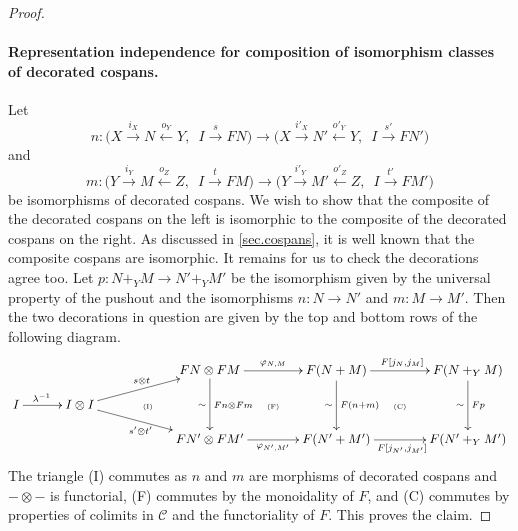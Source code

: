 \begin{proof}
\paragraph{Representation independence for composition of isomorphism
classes of decorated cospans.}
Let 
\[
  n\colon  \big(X \stackrel{i_X}\longrightarrow N \stackrel{o_Y}\longleftarrow Y,\enspace I
\stackrel{s}\longrightarrow FN\big) \longrightarrow \big(X \stackrel{i'_X}\longrightarrow N'
\stackrel{o'_Y}\longleftarrow Y,\enspace I \stackrel{s'}\longrightarrow FN'\big)
\]
and
\[
  m\colon  \big(Y \stackrel{i_Y}\longrightarrow M \stackrel{o_Z}\longleftarrow Z,\enspace I
\stackrel{t}\longrightarrow FM\big) \longrightarrow \big(Y \stackrel{i'_Y}\longrightarrow M'
\stackrel{o'_Z}\longleftarrow Z,\enspace I \stackrel{t'}\longrightarrow FM'\big)
\]
be isomorphisms of decorated cospans. We wish to show that the composite of the
decorated cospans on the left is isomorphic to the composite of the decorated
cospans on the right. As discussed in \textsection\ref{sec.cospans}, it is well
known that the composite cospans are isomorphic. It remains for us to check
the decorations agree too. Let $p\colon N+_YM \to N'+_YM'$ be the isomorphism
given by the universal property of the pushout and the isomorphisms $n\colon N
\to N'$ and $m\colon  M \to M'$. Then the two decorations in question are given
by the top and bottom rows of the following diagram.
\[
  \xymatrixrowsep{1pc}
  \xymatrixcolsep{1pc}
  \xymatrix{
    &&&& FN \otimes FM \ar[dd]^{Fn \otimes Fm}_\sim
    \ar[rr]^{\varphi_{N,M}} && F(N+M) \ar[dd]^{F(n+m)}_\sim
    \ar[rr]^{F[j_N,j_M]} && F(N+_YM) \ar[dd]^{Fp}_\sim \\ 
    I \ar[rr]^(.4){\lambda^{-1}} && I\otimes I \ar[urr]^{s \otimes t}
    \ar[drr]_{s' \otimes t'} &
    \qquad\textrm{\tiny(I)} && \textrm{\tiny(F)} && \textrm{\tiny(C)}\\ 
    &&&& FN' \otimes FM' \ar[rr]_{\varphi_{N',M'}} && F(N'+M')
    \ar[rr]_{F[j_{N'},j_{M'}]} && F(N'+_YM')
  }
\]
The triangle (I) commutes as $n$ and $m$ are morphisms of decorated cospans and
$- \otimes -$ is functorial, (F) commutes by the monoidality of $F$, and (C)
commutes by properties of colimits in $\mathcal C$ and the functoriality of $F$.
This proves the claim.


\end{proof}
